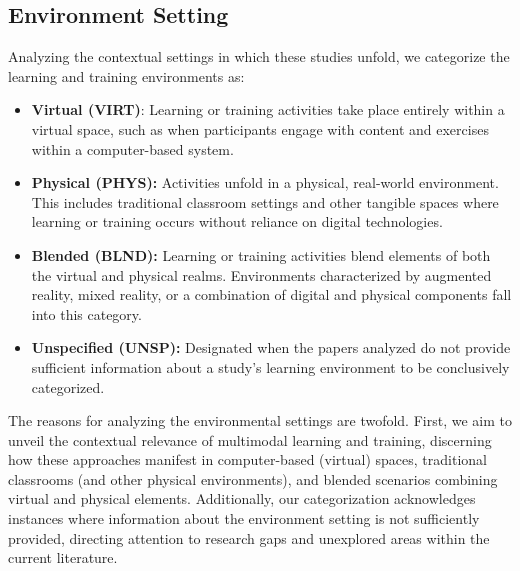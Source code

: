 \documentclass[manuscript,screen,review]{acmart}
\begin{document}
\subsection{Environment Setting} \label{subsec:environment_setting}

Analyzing the contextual settings in which these studies unfold, we categorize the learning and training environments as: %

\begin{itemize}
    \item \textbf{Virtual (VIRT)}: Learning or training activities take place entirely within a virtual space, such as when participants engage with content and exercises within a computer-based system.  
    \item \textbf{Physical (PHYS):} Activities unfold in a physical, real-world environment. This includes traditional classroom settings and other tangible spaces where learning or training occurs without reliance on digital technologies. 
    \item \textbf{Blended (BLND):} Learning or training activities blend elements of both the virtual and physical realms. Environments characterized by augmented reality, mixed reality, or a combination of digital and physical components fall into this category. 
    \item \textbf{Unspecified (UNSP):} Designated when the papers analyzed do not provide sufficient information about a study's learning environment to be conclusively categorized.    
\end{itemize}

The reasons for analyzing the environmental settings are twofold. First, we aim to unveil the contextual relevance of multimodal learning and training, discerning how these approaches manifest in computer-based (virtual) spaces, traditional classrooms (and other physical environments), and blended scenarios combining virtual and physical elements. Additionally, our categorization acknowledges instances where information about the environment setting is not sufficiently provided, directing attention to research gaps and unexplored areas within the current literature.
\end{document}
